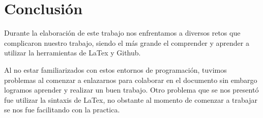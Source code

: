 \section{Conclusión} \label{sec:conclusion}
\vspace{10mm}
Durante la elaboración de este trabajo nos enfrentamos a diversos retos que complicaron nuestro trabajo, siendo el más grande el comprender y aprender a utilizar la herramientas de LaTex y Github. 

Al no estar familiarizados con estos entornos de programación, tuvimos problemas al comenzar a enlazarnos para colaborar en el documento sin embargo logramos aprender y realizar un buen trabajo. Otro problema que se nos presentó fue utilizar la sintaxis de LaTex, no obstante al momento de comenzar a trabajar se nos fue facilitando con la practica. 
\newpage  %
